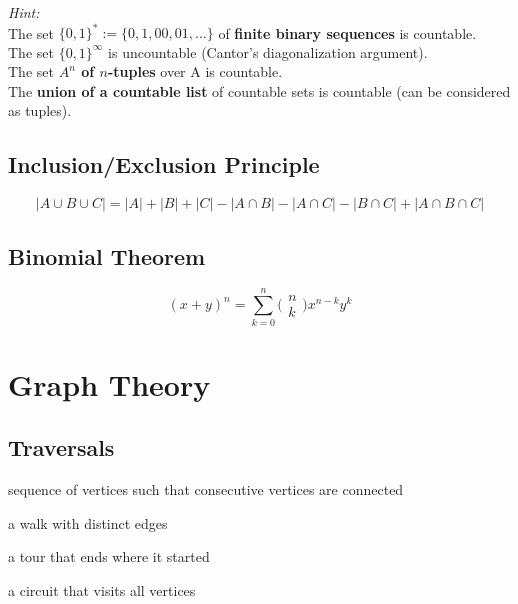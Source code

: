 \documentclass[11pt]{article}
\begin{document}
\emph{Hint:} \\
The set $\{0,1\}^* := \{0,1, 00, 01, ...\}$ of \textbf{finite binary sequences} is countable. \\
The set $\{0,1\}^\infty$ is uncountable (Cantor's diagonalization argument). \\
The set \textbf{$A^n$ of $n$-tuples} over A is countable. \\
The \textbf{union of a countable list} of countable sets is countable (can be considered as  tuples).

\subsection{Inclusion/Exclusion Principle}

\begin{equation*}
	|A \cup B \cup C| = |A| + |B| + |C| - |A\cap B| - |A\cap C| - |B\cap C| + |A\cap B\cap C|
\end{equation*}

\subsection{Binomial Theorem}

\begin{equation*}
	(x + y)^n = \sum^n_{k=0} \bigl(\begin{smallmatrix}n\\k \end{smallmatrix}\bigr) x^{n-k}y^k
\end{equation*}

\section{Graph Theory}

\subsection{Traversals}

\begin{description}[labelindent=16pt,style=multiline,leftmargin=4.5cm, noitemsep]
	\item[walk:] sequence of vertices such that consecutive vertices are connected
	\item[tour:] a walk with distinct edges
	\item[circuit:] a tour that ends where it started
	\item[Hamiltonian cycle:] a circuit that visits all vertices
\end{description}
\end{document}
